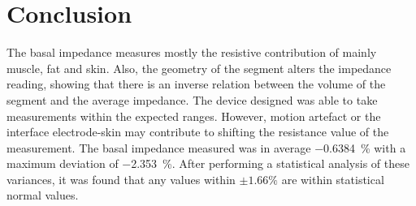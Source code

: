 \section{Conclusion}
\label{senction basal 5} 
The basal impedance measures mostly the resistive contribution of mainly muscle, fat and skin. Also, the geometry of the segment alters the impedance reading, showing that there is an inverse relation between the volume of the segment and the average impedance. The device designed was able to take measurements within the expected ranges. However, motion artefact or the interface electrode-skin may contribute to shifting the resistance value of the measurement. The basal impedance measured was in average \SI{-0.6384}{\percent} with a maximum deviation of \SI{-2.353}{\percent}. After performing a statistical analysis of these variances, it was found that any values within $\pm 1.66 \%$ are within statistical normal values. 

